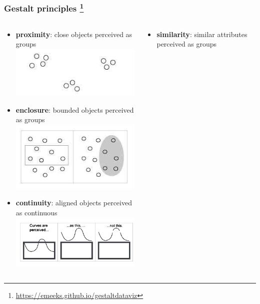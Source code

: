 \begin{frame}
  \frametitle{Gestalt principles
  \footnote{\tiny{\href{https://emeeks.github.io/gestaltdataviz}{https://emeeks.github.io/gestaltdataviz}}}
  }
  \begin{scriptsize}
  \begin{columns}[T]
    \begin{column}{5.5cm}  
      \begin{itemize}  
        \item \textbf{proximity}: close objects perceived as groups\\
          \includegraphics[height=0.15\textheight]{images/gestalt_proximity}
        \item \textbf{enclosure}: bounded objects perceived as groups\\
          \includegraphics[height=0.15\textheight]{images/gestalt_enclosure}          
        \item \textbf{continuity}: aligned objects perceived as continuous\\
          \includegraphics[height=0.15\textheight]{images/gestalt_continuity}          
      \end{itemize}  
    \end{column}
    \begin{column}{5.5cm}  
      \begin{itemize}
        \item \textbf{similarity}: similar attributes perceived as groups\\

\end{itemize}
\end{column}
\end{columns}
\end{scriptsize}
\end{frame}

